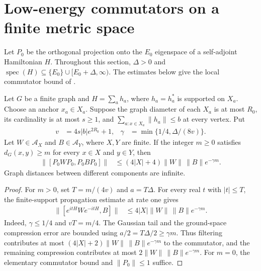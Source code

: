 \section{Low-energy commutators on a finite metric space}
\label{sec:hastings05_metric_commutator}

Let $P_0$ be the orthogonal projection onto the $E_0$ eigenspace of a
self-adjoint Hamiltonian $H$. Throughout this section, $\Delta>0$ and
$\operatorname{spec}(H)\subseteq\{E_0\}\cup[E_0+\Delta,\infty)$.
The estimates below give the local commutator bound of
\cite[eqs.~(lc) and (blecm), lines 1548--1601]{Hastings2006Solving}.

\begin{lemma}
    \label{thm:hastings05_graph_commutator}
    \leanok
    Let $G$ be a finite graph and $H=\sum_a h_a$, where $h_a=h_a^*$ is
    supported on $X_a$. Choose an anchor $x_a\in X_a$. Suppose the graph
    diameter of each $X_a$ is at most $R_0$, its cardinality is at most
    $s\ge1$, and $\sum_{a:x\in X_a}\|h_a\|\le b$ at every vertex.
    Put
    \begin{align}
        v&=4s|b|e^{2R_0}+1,&
        \gamma&=\min\{1/4,\Delta/(8v)\}.
        \label{eq:hastings05_graph_commutator_rate}
    \end{align}
    Let $W\in\mathcal A_X$ and $B\in\mathcal A_Y$, where $X,Y$ are
    finite. If the integer $m\ge0$ satisfies $d_G(x,y)\ge m$ for every
    $x\in X$ and $y\in Y$, then
    \begin{align}
        \|[P_0WP_0,P_0BP_0]\|
        &\le(4|X|+4)\|W\|\,\|B\|e^{-\gamma m}.
        \label{eq:hastings05_graph_commutator}
    \end{align}
    Graph distances between different components are infinite.
\end{lemma}
\begin{proof}\leanok
    For $m>0$, set $T=m/(4v)$ and $a=T\Delta$.
    For every real $t$ with $|t|\le T$, the finite-support propagation
    estimate at rate one gives
    \begin{align}
        \|[e^{itH}We^{-itH},B]\|
        &\le4|X|\|W\|\,\|B\|e^{-\gamma m}.
        \label{eq:hastings05_graph_time}
    \end{align}
    Indeed, $\gamma\le1/4$ and $vT=m/4$.
    The Gaussian tail and the ground-space compression error are bounded
    using $a/2=T\Delta/2\ge\gamma m$. Thus filtering contributes at most
    $(4|X|+2)\|W\|\,\|B\|e^{-\gamma m}$ to the commutator, and the
    remaining compression contributes at most
    $2\|W\|\,\|B\|e^{-\gamma m}$.
    For $m=0$, the elementary commutator bound and $\|P_0\|\le1$ suffice.
\end{proof}

